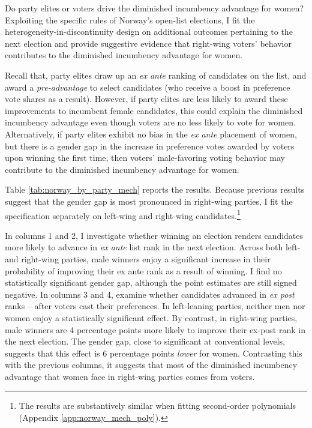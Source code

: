 \documentclass[12pt]{article}
\begin{document}
Do party elites or voters drive the diminished incumbency advantage for women? Exploiting the specific rules of Norway's open-list elections, I fit the heterogeneity-in-discontinuity design on additional outcomes pertaining to the next election and provide suggestive evidence that right-wing voters' behavior contributes to the diminished incumbency advantage for women.

Recall that, party elites draw up an \emph{ex ante} ranking of candidates on the list, and award a \emph{pre-advantage} to select candidates (who receive a boost in preference vote shares as a result). However, if party elites are less likely to award these improvements to incumbent female candidates, this could explain the diminished incumbency advantage even though voters are no less likely to vote for women. Alternatively, if party elites exhibit no bias in the \emph{ex ante} placement of women, but there is a gender gap in the increase in preference votes awarded by voters upon winning the first time, then voters' male-favoring voting behavior may contribute to the diminished incumbency advantage for women.



Table \ref{tab:norway_by_party_mech} reports the results.
Because previous results suggest that the gender gap is most pronounced in right-wing parties, I fit the specification separately on left-wing and right-wing candidates.\footnote{The results are substantively similar when fitting second-order polynomials (Appendix \ref{app:norway_mech_poly}).}

In columns 1 and 2, I investigate whether winning an election renders candidates more likely to advance in \emph{ex ante} list rank in the next election. Across both left- and right-wing parties, male winners enjoy a significant increase in their probability of improving their ex ante rank as a result of winning. I find no statistically significant gender gap, although the point estimates are still signed negative.
In columns 3 and 4, examine whether candidates advanced in \emph{ex post} ranks -- after voters cast their preferences. In left-leaning parties, neither men nor women enjoy a statistically significant effect. By contrast, in right-wing parties, male winners are 4 percentage points more likely to improve their ex-post rank in the next election. The gender gap, close to significant at conventional levels, suggests that this effect is 6 percentage points \emph{lower} for women. Contrasting this with the previous columns, it suggests that most of the diminished incumbency advantage that women face in right-wing parties comes from voters.
\end{document}
